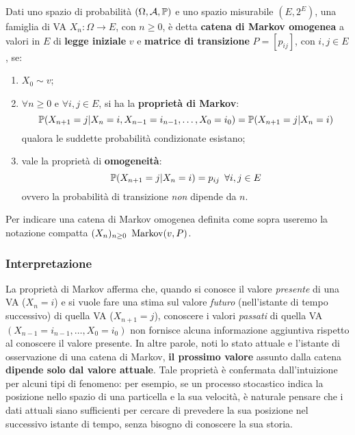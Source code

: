 \begin{defn}\label{cat-mark}
	Dati uno spazio di probabilità $(\Omega, \mathcal A, \mathbb P)$ e uno spazio misurabile $(E, 2^E)$, una famiglia di VA $X_n: \Omega \to E$,
	con $n \ge 0$, è detta \textbf{catena di Markov omogenea} a valori in $E$ di \textbf{legge iniziale} $v$ e
	\textbf{matrice di transizione} $P = [p_{ij}]$, con $i,j \in E$, se:
	\begin{enumerate}
		\item $X_0 \sim v$;
		\item $\forall n \ge 0$ e $\forall i,j \in E$, si ha la \textbf{proprietà di Markov}: \\
		$$\mathbb P(X_{n+1} = j |
		X_n=i, X_{n-1}=i_{n-1},\dots,X_0=i_0) =
		\mathbb P(X_{n+1} = j | X_n = i)$$
		qualora le suddette probabilità condizionate esistano;
		\item vale la proprietà di \textbf{omogeneità}: $$\mathbb P(X_{n+1} = j | X_n = i) = p_{ij} \enspace \forall i,j \in E$$
		ovvero la probabilità di transizione \emph{non} dipende da $n$.
	\end{enumerate}
	Per indicare una catena di Markov omogenea definita come sopra useremo la notazione compatta $(X_n)_{n \ge 0} \ \operatorname{Markov}(v,P)$.
\end{defn}
\subsubsection{Interpretazione}
La proprietà di Markov afferma che, quando si conosce il valore \emph{presente} di una VA ($X_n = i$)
e si vuole fare una stima sul valore \emph{futuro} (nell'istante di tempo successivo) di quella VA ($X_{n+1} = j$), conoscere i valori
\emph{passati} di quella VA $(X_{n-1} = i_{n-1}, \dots, X_0 = i_0)$ non fornisce alcuna informazione aggiuntiva
rispetto al conoscere il valore presente.
In altre parole, noti lo stato attuale e l'istante di osservazione di una catena di Markov, \textbf{il prossimo valore} assunto dalla catena \textbf{dipende solo dal valore attuale}.
Tale proprietà è confermata dall'intuizione per alcuni tipi di fenomeno: per esempio, se un processo
stocastico indica la posizione nello spazio di una particella e la sua velocità, è naturale pensare
che i dati attuali siano sufficienti per cercare di prevedere la sua posizione nel successivo istante di tempo, senza bisogno di conoscere la sua storia.

